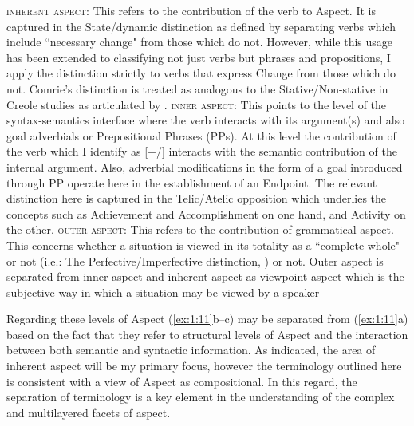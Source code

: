 \ea\label{ex:1:11}
  \ea \textsc{inherent aspect}: This refers to the contribution of the verb to
  Aspect.  It is captured in the State\slash dynamic distinction as defined by
  \citet{Comrie1976} separating verbs which include ``necessary change" from
  those which do not.  However, while this usage has been extended to
  classifying not just verbs but phrases and propositions, I apply the
  distinction strictly to verbs that express Change from those which do
  not. Comrie's distinction is treated as analogous to the Stative\slash Non-stative
  in Creole studies as articulated by \citet{Bickerton1975,Bickerton1981}.
  \ex \textsc{inner aspect}: This points to the level of the syntax-semantics
  interface where the verb interacts with its argument(s) and also goal
  adverbials or Prepositional Phrases (PPs). At this level the contribution of
  the verb which I identify as [+/\textminus \CHANGE] interacts with the semantic
  contribution of the internal argument.  Also, adverbial modifications in the
  form of a goal introduced through PP operate here in the establishment of an
  Endpoint.  The relevant distinction here is captured in the Telic\slash Atelic
  opposition which underlies the concepts such as Achievement and Accomplishment
  on one hand, and Activity on the other.
  \ex \textsc{outer aspect}: This refers to the contribution of grammatical aspect.
  This concerns whether a situation is viewed in its totality as a ``complete
  whole" or not (i.e.: The Perfective\slash Imperfective distinction,
  \citealt{Comrie1976}) or not.  Outer aspect is separated from inner aspect and
  inherent aspect as viewpoint aspect which is the subjective way in which a
  situation may be viewed by a speaker \citep{Klein1994,Smith1983,Smith1991}
  \z
\z

Regarding these levels of Aspect (\ref{ex:1:11}b--c) may be separated from
(\ref{ex:1:11}a) based on the fact that they refer to structural
levels of Aspect and the interaction between both semantic and
syntactic information.  As indicated, the area of inherent aspect will
be my primary focus, however the terminology outlined here is
consistent with a view of Aspect as compositional.  In this regard,
the separation of terminology is a key element in the understanding of
the complex and multilayered facets of aspect.

